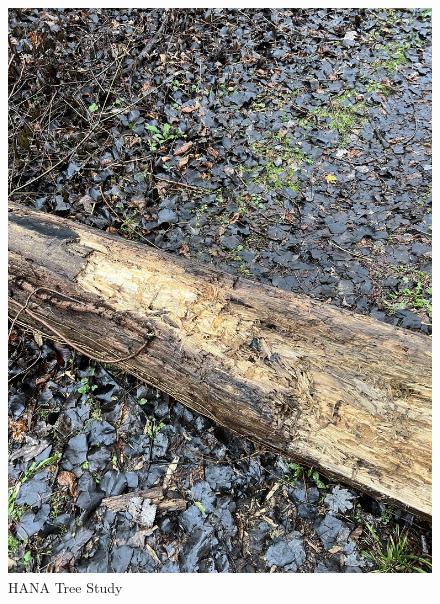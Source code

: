 \documentclass{article}
\begin{document}
\begin{figure}[h!]
\centering
\includegraphics[scale=.1]{Research/HANA/NOV2024/IMG_9852.JPG}
\caption{HANA Tree Study}
\label{fig:HANA}
\end{figure}
\end{document}
